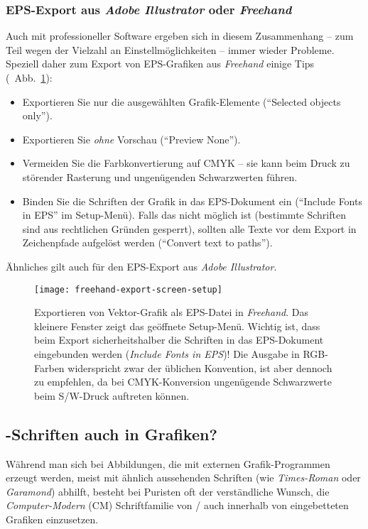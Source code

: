 \subsubsection{EPS-Export aus \emph{Adobe Illustrator} oder \emph{Freehand}}

Auch mit professioneller Software ergeben sich in diesem
Zusammenhang -- zum Teil wegen der Vielzahl an
Einstellmöglichkeiten -- immer wieder Probleme. Speziell daher zum
Export von EPS-Grafiken aus \emph{Freehand} einige Tips %
(\sa\ Abb.~\ref{fig:freehand-export-screen-setup}):
%
\begin{itemize}
\item Exportieren Sie nur die ausgewählten Grafik-Elemente
("`Selected objects only"'). %
\item Exportieren Sie \emph{ohne} Vorschau ("`Preview None"'). %
\item Vermeiden Sie die Farbkonvertierung auf CMYK -- sie kann beim
Druck zu störender Rasterung und ungenügenden Schwarzwerten füh\-ren.
\item Binden Sie die Schriften der Grafik in das EPS-Dokument ein
("`Include Fonts in EPS"' im Setup-Menü). Falls das nicht möglich
ist (bestimmte Schriften sind aus rechtlichen Gründen gesperrt),
sollten alle Texte vor dem Export in Zeichenpfade aufgelöst werden
("`Convert text to paths"').
\end{itemize}
%
Ähnliches gilt auch für den EPS-Export aus \emph{Adobe Illustrator}.

\begin{figure}
\centering
\texttt{[image: freehand-export-screen-setup]}
\caption{Exportieren von Vektor-Grafik als EPS-Datei in {\em
Freehand}. Das kleinere Fenster zeigt das geöffnete Setup-Menü.
Wichtig ist, dass beim Export sicherheitshalber die Schriften in
das EPS-Dokument eingebunden werden (\emph{Include Fonts in
EPS})! Die Ausgabe in RGB-Farben widerspricht zwar der üblichen Konvention, 
ist aber dennoch zu empfehlen, da bei CMYK-Konversion ungenügende Schwarzwerte 
beim S/W-Druck auftreten können.} \label{fig:freehand-export-screen-setup}
\end{figure}


\subsection{\tex-Schriften auch in Grafiken?}
\label{sec:tex-schriften-in-grafiken}

Während man sich bei Abbildungen, die mit externen
Grafik-Programmen erzeugt werden, meist mit ähnlich aussehenden
Schriften (wie \emph{Times-Roman} oder \emph{Garamond}) abhilft,
besteht bei Puristen oft der verständliche Wunsch, die 
\emph{Computer-Modern} (CM) Schriftfamilie von {\tex}/{\latex} auch
innerhalb von eingebetteten Grafiken einzusetzen.

